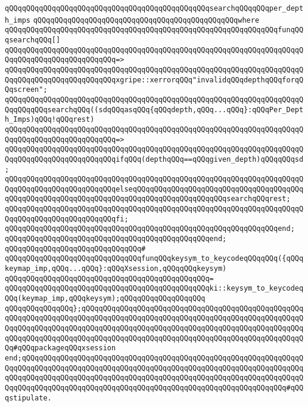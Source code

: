 \verb|qQQqqQQqqQQqqQQqqQQqqQQqqQQqqQQqqQQqqQQqqQQqqQQqsearchqQQqqQQqper_depth_imps|\newline
\verb|qQQqqQQqqQQqqQQqqQQqqQQqqQQqqQQqqQQqqQQqqQQqqQQqwhere|\newline
\verb|qQQqqQQqqQQqqQQqqQQqqQQqqQQqqQQqqQQqqQQqqQQqqQQqqQQqqQQqqQQqqQQqfunqQQqsearchqQQq[]|\newline
\verb|qQQqqQQqqQQqqQQqqQQqqQQqqQQqqQQqqQQqqQQqqQQqqQQqqQQqqQQqqQQqqQQqqQQqqQQqqQQqqQQqqQQqqQQqqQQqqQQq=>|\newline
\verb|qQQqqQQqqQQqqQQqqQQqqQQqqQQqqQQqqQQqqQQqqQQqqQQqqQQqqQQqqQQqqQQqqQQqqQQqqQQqqQQqqQQqqQQqqQQqqQQqxgripe::xerrorqQQq"invalidqQQqdepthqQQqforqQQqscreen";|\newline
\newline
\verb|qQQqqQQqqQQqqQQqqQQqqQQqqQQqqQQqqQQqqQQqqQQqqQQqqQQqqQQqqQQqqQQqqQQqqQQqqQQqqQQqsearchqQQq((sdqQQqasqQQq{qQQqdepth,qQQq...qQQq}:qQQqPer_Depth_Imps)qQQq!qQQqrest)|\newline
\verb|qQQqqQQqqQQqqQQqqQQqqQQqqQQqqQQqqQQqqQQqqQQqqQQqqQQqqQQqqQQqqQQqqQQqqQQqqQQqqQQqqQQqqQQqqQQqqQQq=>|\newline
\verb|qQQqqQQqqQQqqQQqqQQqqQQqqQQqqQQqqQQqqQQqqQQqqQQqqQQqqQQqqQQqqQQqqQQqqQQqqQQqqQQqqQQqqQQqqQQqqQQqifqQQq(depthqQQq==qQQqgiven_depth)qQQqqQQqsd;|\newline
\verb|qQQqqQQqqQQqqQQqqQQqqQQqqQQqqQQqqQQqqQQqqQQqqQQqqQQqqQQqqQQqqQQqqQQqqQQqqQQqqQQqqQQqqQQqqQQqqQQqelseqQQqqQQqqQQqqQQqqQQqqQQqqQQqqQQqqQQqqQQqqQQqqQQqqQQqqQQqqQQqqQQqqQQqqQQqqQQqqQQqqQQqqQQqqQQqsearchqQQqrest;|\newline
\verb|qQQqqQQqqQQqqQQqqQQqqQQqqQQqqQQqqQQqqQQqqQQqqQQqqQQqqQQqqQQqqQQqqQQqqQQqqQQqqQQqqQQqqQQqqQQqqQQqfi;|\newline
\verb|qQQqqQQqqQQqqQQqqQQqqQQqqQQqqQQqqQQqqQQqqQQqqQQqqQQqqQQqqQQqqQQqend;|\newline
\verb|qQQqqQQqqQQqqQQqqQQqqQQqqQQqqQQqqQQqqQQqqQQqqQQqend;|\newline
\verb|qQQqqQQqqQQqqQQqqQQqqQQqqQQqqQQq#|\newline
\verb|qQQqqQQqqQQqqQQqqQQqqQQqqQQqqQQqfunqQQqkeysym_to_keycodeqQQqqQQq({qQQqkeymap_imp,qQQq...qQQq}:qQQqXsession,qQQqqQQqkeysym)|\newline
\verb|qQQqqQQqqQQqqQQqqQQqqQQqqQQqqQQqqQQqqQQqqQQqqQQq=|\newline
\verb|qQQqqQQqqQQqqQQqqQQqqQQqqQQqqQQqqQQqqQQqqQQqqQQqki::keysym_to_keycodeqQQq(keymap_imp,qQQqkeysym);qQQqqQQqqQQqqQQqqQQq|\newline
\newline
\verb|qQQqqQQqqQQqqQQq};qQQqqQQqqQQqqQQqqQQqqQQqqQQqqQQqqQQqqQQqqQQqqQQqqQQqqQQqqQQqqQQqqQQqqQQqqQQqqQQqqQQqqQQqqQQqqQQqqQQqqQQqqQQqqQQqqQQqqQQqqQQqqQQqqQQqqQQqqQQqqQQqqQQqqQQqqQQqqQQqqQQqqQQqqQQqqQQqqQQqqQQqqQQqqQQqqQQqqQQqqQQqqQQqqQQqqQQqqQQqqQQqqQQqqQQqqQQqqQQqqQQqqQQqqQQqqQQqqQQqqQQq#qQQqpackageqQQqxsession|\newline
\verb|end;qQQqqQQqqQQqqQQqqQQqqQQqqQQqqQQqqQQqqQQqqQQqqQQqqQQqqQQqqQQqqQQqqQQqqQQqqQQqqQQqqQQqqQQqqQQqqQQqqQQqqQQqqQQqqQQqqQQqqQQqqQQqqQQqqQQqqQQqqQQqqQQqqQQqqQQqqQQqqQQqqQQqqQQqqQQqqQQqqQQqqQQqqQQqqQQqqQQqqQQqqQQqqQQqqQQqqQQqqQQqqQQqqQQqqQQqqQQqqQQqqQQqqQQqqQQqqQQqqQQqqQQqqQQqqQQq#qQQqstipulate.|\newline
\newline

